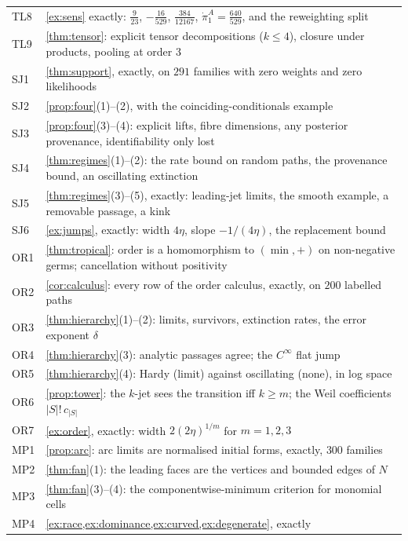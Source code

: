 \documentclass[11pt]{article}
\theoremstyle{definition}\newtheorem{definition}[theorem]{Definition}\newtheorem{remark}[theorem]{Remark}\newtheorem{example}[theorem]{Example}
\begin{document}
\begin{center}
\begin{tabular}{lp{}}
TL8 & \cref{ex:sens} exactly: $\tfrac9{23}$, $-\tfrac{16}{529}$, $\tfrac{384}{12167}$, $\dot\pi^A_1=\tfrac{640}{529}$, and the reweighting split\\
TL9 & \cref{thm:tensor}: explicit tensor decompositions ($k\le4$), closure under products, pooling at order $3$\\\midrule
SJ1 & \cref{thm:support}, exactly, on $291$ families with zero weights and zero likelihoods\\
SJ2 & \cref{prop:four}(1)--(2), with the coinciding-conditionals example\\
SJ3 & \cref{prop:four}(3)--(4): explicit lifts, fibre dimensions, any posterior provenance, identifiability only lost\\
SJ4 & \cref{thm:regimes}(1)--(2): the rate bound on random paths, the provenance bound, an oscillating extinction\\
SJ5 & \cref{thm:regimes}(3)--(5), exactly: leading-jet limits, the smooth example, a removable passage, a kink\\
SJ6 & \cref{ex:jumps}, exactly: width $4\eta$, slope $-1/(4\eta)$, the replacement bound\\\midrule
OR1 & \cref{thm:tropical}: order is a homomorphism to $(\min,+)$ on non-negative germs; cancellation without positivity\\
OR2 & \cref{cor:calculus}: every row of the order calculus, exactly, on $200$ labelled paths\\
OR3 & \cref{thm:hierarchy}(1)--(2): limits, survivors, extinction rates, the error exponent $\delta$\\
OR4 & \cref{thm:hierarchy}(3): analytic passages agree; the $C^\infty$ flat jump\\
OR5 & \cref{thm:hierarchy}(4): Hardy (limit) against oscillating (none), in log space\\
OR6 & \cref{prop:tower}: the $k$-jet sees the transition iff $k\ge m$; the Weil coefficients $|S|!\,c_{|S|}$\\
OR7 & \cref{ex:order}, exactly: width $2(2\eta)^{1/m}$ for $m=1,2,3$\\\midrule
MP1 & \cref{prop:arc}: arc limits are normalised initial forms, exactly, $300$ families\\
MP2 & \cref{thm:fan}(1): the leading faces are the vertices and bounded edges of $N$\\
MP3 & \cref{thm:fan}(3)--(4): the componentwise-minimum criterion for monomial cells\\
MP4 & \cref{ex:race,ex:dominance,ex:curved,ex:degenerate}, exactly\\

\end{tabular}
\end{center}
\end{document}
